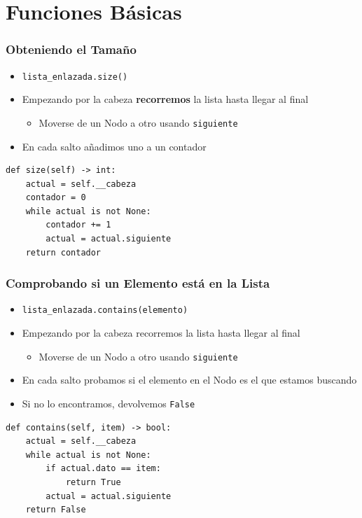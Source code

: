 \documentclass[11pt]{beamer}
\begin{document}
\section{Funciones Básicas}

	\begin{frame}[fragile]
		\frametitle{Obteniendo el Tamaño}
		\begin{itemize}
			\item \lstinline|lista_enlazada.size()|
			\item Empezando por la cabeza \textbf{recorremos} la lista hasta llegar al final
			\begin{itemize}
				\item Moverse de un Nodo a otro usando \texttt{siguiente}
			\end{itemize}
			\item En cada salto añadimos uno a un contador
		\end{itemize}
		\vspace{0.5cm}
        \pause
		\begin{lstlisting}
def size(self) -> int:
	actual = self.__cabeza
	contador = 0
	while actual is not None:
		contador += 1
		actual = actual.siguiente
	return contador
		\end{lstlisting}
	\end{frame}

	\begin{frame}[fragile]
		\frametitle{Comprobando si un Elemento está en la Lista}
		\begin{itemize}
			\item \lstinline|lista_enlazada.contains(elemento)|
			\item Empezando por la cabeza recorremos la lista hasta llegar al final
			\begin{itemize}
				\item Moverse de un Nodo a otro usando \texttt{siguiente}
			\end{itemize}
			\item En cada salto probamos si el elemento en el Nodo es el que estamos buscando
			\item Si no lo encontramos, devolvemos \lstinline|False|
		\end{itemize}
		\vspace{0.5cm}
        \pause
		\begin{lstlisting}
def contains(self, item) -> bool:
	actual = self.__cabeza
	while actual is not None:
		if actual.dato == item:
			return True
		actual = actual.siguiente
	return False
		\end{lstlisting}
	\end{frame}
\end{document}
